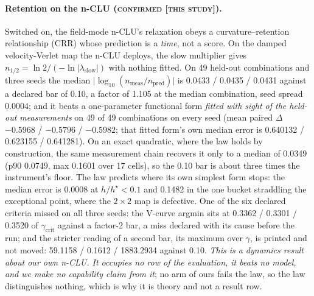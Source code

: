 \documentclass{article} %
\begin{document}
\paragraph{Retention on the n-CLU (\textsc{confirmed [this study]}).} Switched on, the field-mode
n-CLU's relaxation obeys a curvature--retention relationship (CRR) whose prediction is a
\emph{time}, not a score. On the damped velocity-Verlet map the n-CLU deploys, the slow
multiplier gives $n_{1/2}=\ln2/(-\ln\lvert\lambda_{\text{slow}}\rvert)$ with nothing fitted. On 49
held-out combinations and three seeds the median $\lvert\log_{10}(n_{\text{meas}}/n_{\text{pred}})\rvert$ is
0.0433 / 0.0435 / 0.0431 against a declared bar of 0.10, a factor of 1.105 at the median
combination, seed spread 0.0004; and it beats a one-parameter functional form \emph{fitted with sight
of the held-out measurements} on 49 of 49 combinations on every seed (mean paired $\Delta$ $-0.5968$ /
$-0.5796$ / $-0.5982$; that fitted form's own median error is 0.640132 / 0.623155 / 0.641281).
On an exact quadratic, where the law holds by construction, the same measurement chain recovers it
only to a median of 0.0349 (p90 0.0749, max 0.1601 over 17 cells), so the 0.10 bar is about three
times the instrument's floor. %
The law predicts where its own simplest form stops: the median error is 0.0008 at $h/h^\star<0.1$
and 0.1482 in the one bucket straddling the exceptional point, where the $2\times2$ map is
defective. %
One of the six declared criteria missed on all three seeds: the V-curve argmin sits at 0.3362 /
0.3301 / 0.3520 of $\gamma_{\text{crit}}$ against a factor-2 bar, a miss declared with its
cause before the run; and the stricter reading of a second bar, its maximum over $\gamma$, is
printed and not moved: 59.1158 / 0.1612 / 1883.2934 against 0.10.
\emph{This is a dynamics result about our own n-CLU. It occupies no row of the evaluation, it
beats no model, and we make no capability claim from it}; no arm of ours fails the law, so the law
distinguishes nothing, which is why it is theory and not a result row.
\end{document}
